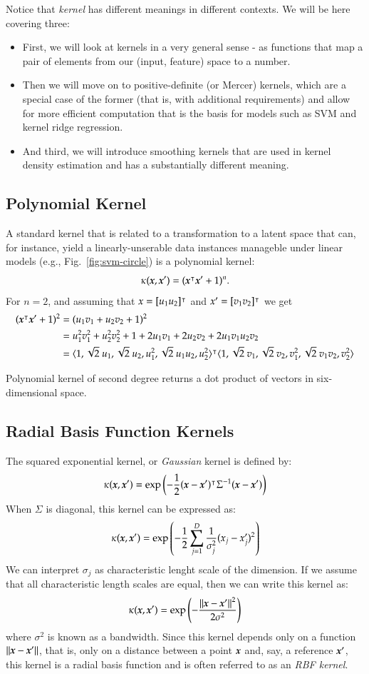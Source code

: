 \begin{refsection}
Notice that \emph{kernel} has different meanings in different contexts. We will be here covering three:

\begin{itemize}
\item First, we will look at kernels in a very general sense - as functions that map a pair of elements from our (input, feature) space to a number.
\item Then we will move on to positive-definite (or Mercer) kernels, which are a special case of the former (that is, with additional requirements) and allow for more efficient computation that is the basis for models such as SVM and kernel ridge regression.
\item And third, we will introduce smoothing kernels that are used in kernel density estimation and has a substantially different meaning.
\end{itemize}

\subsection*{Polynomial Kernel}

A standard kernel that is related to a transformation to a latent space that can, for instance, yield a linearly-unserable data instances manageble under linear models (e.g., Fig.~\ref{fig:svm-circle}) is a polynomial kernel:
$$ \kappa(\boldsymbol{x},\boldsymbol{x}')=(\boldsymbol{x}^\intercal \boldsymbol{x}'+1)^n.$$
For $n=2$, and assuming that $x=[u_1 u_2]^\intercal$ and $x'=[v_1 v_2]^\intercal$ we get
\begin{align*}
(\boldsymbol{x}^\intercal \boldsymbol{x}'+1)^2 & = (u_1 v_1 + u_2 v_2 +1)^2 \\
& = u_1^2 v_1^2 + u_2^2 v_2^2 + 1 + 2 u_1 v_1 + 2 u_2 v_2 + 2 u_1 v_1 u_2 v_2 \\
& = \langle 1, \sqrt{2}\ u_1, \sqrt{2}\ u_2, u_1^2, \sqrt{2}\ u_1 u_2, u_2^2\rangle^\intercal  \langle 1, \sqrt{2}\ v_1, \sqrt{2}\ v_2, v_1^2, \sqrt{2}\ v_1 v_2, v_2^2\rangle
\end{align*}

Polynomial kernel of second degree returns a dot product of vectors in six-dimensional space.

\subsection*{Radial Basis Function Kernels}

The squared exponential kernel, or {\em Gaussian} kernel is defined by:
$$ \kappa(\boldsymbol{x}, \boldsymbol{x}')=\exp\left( -{1\over 2}(\boldsymbol{x}-\boldsymbol{x}')^\intercal\Sigma^{-1}(\boldsymbol{x}-\boldsymbol{x}') \right) $$
When $\Sigma$ is diagonal, this kernel can be expressed as:
$$ \kappa(\boldsymbol{x},\boldsymbol{x}')=\exp\left(-{1\over 2}\sum_{j=1}^D {1\over\sigma_j^2}(x_j-x_j')^2 \right) $$
We can interpret $\sigma_j$ as characteristic lenght scale of the dimension. If we assume that all characteristic length scales are equal, then we can write this kernel as:
$$ \kappa(\boldsymbol{x},\boldsymbol{x}')=\exp\left( - {\left\lVert\boldsymbol{x}-\boldsymbol{x}'\right\rVert^2\over 2\sigma^2}\right) $$
where $\sigma^2$ is known as a bandwidth. Since this kernel depends only on a function $\left\lVert\boldsymbol{x}-\boldsymbol{x}'\right\rVert$, that is, only on a distance between a point $\boldsymbol{x}$ and, say, a reference $\boldsymbol{x}'$, this kernel is a radial basis function and is often referred to as an {\em RBF kernel}.


\end{refsection}
